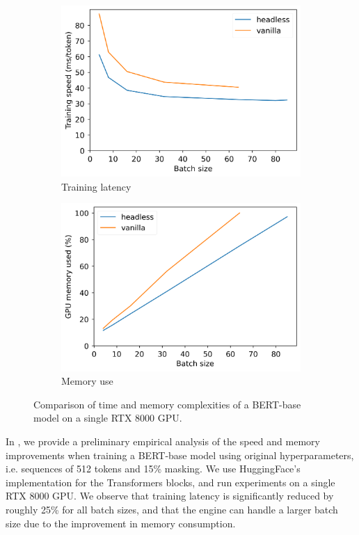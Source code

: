 \begin{figure}[h]
    \centering
    \begin{subfigure}{0.48\columnwidth}
         \includegraphics[width=\linewidth]{sources/part_2/headless/imgs/bert_train_speed_p13.png}
         \caption{Training latency}
         \label{fig:speedup}
    \end{subfigure}
    \begin{subfigure}{0.48\columnwidth}
         \includegraphics[width=\linewidth]{sources/part_2/headless/imgs/bert_memory_use_p13.png}
         \caption{Memory use}
         \label{fig:memuse}
    \end{subfigure}
    \caption{Comparison of time and memory complexities of a BERT-base model on a single RTX 8000 GPU.}
    \label{fig:comparison}
\end{figure}
In , we provide a preliminary empirical analysis of the speed and memory improvements when training a BERT-base model using original hyperparameters, i.e. sequences of 512 tokens and 15\% masking. We use HuggingFace's implementation for the Transformers blocks, and run experiments on a single RTX 8000 GPU.
We observe that training latency is significantly reduced by roughly 25\% for all batch sizes, and that the engine can handle a larger batch size due to the improvement in memory consumption.

